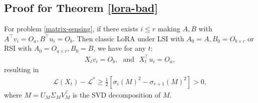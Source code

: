 \subsection{Proof for Theorem \ref{lora-bad}}
\label{lora-bad-proof}
\begin{theorem}
    For problem \ref{matrix-sensing}, if there exists $i\leq r$ making $A,B$ with $A^\top v_i=O_a,B^\top u_i=O_b$. Then classic LoRA under LSI with $A_0=A,B_0=O_{b\times r}$ or RSI with $A_0=O_{a\times r},B_0=B$, we have for any $t$:
    \begin{align*}
        X_tv_i=O_b,~~~\text{and}~~~X_t^\top u_i=O_a,
    \end{align*}
    resulting in
    \begin{align*}
        \mathcal{L}(X_t)-\mathcal{L}^*\geq \frac{1}{2}[\sigma_i(M)^2-\sigma_{r+1}(M)^2]>0,
    \end{align*}
    where $M=U_M\Sigma_MV_M^\top$ is the SVD decomposition of $M$. 
\end{theorem}
